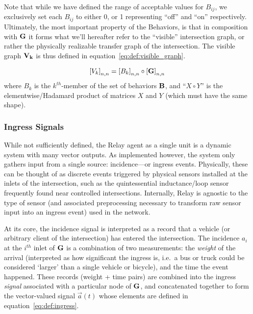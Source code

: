 \documentclass{report}
\begin{document}
Note that while we have defined the range of acceptable values for $B_{ij}$, we exclusively set each $B_{ij}$ to either 0, or 1 representing ``off'' and ``on'' respectively.
Ultimately, the most important property of the Behaviors, is that in composition with $\bf{G}$ it forms what we'll hereafter refer to the ``visible'' intersection graph, or rather the physically realizable transfer graph of the intersection.
The visible graph $\bf{V}_k$ is thus defined in equation~\eqref{eq:def:visible_graph}.

\begin{equation}\label{eq:def:visible_graph}
	\left[V_k\right]_{n,n} = \left[B_k\right]_{n,n} \circ \left[\bf{G}\right]_{n,n}
\end{equation}
where $B_k$ is the $k^{th}$-member of the set of behaviors $\bf{B}$, and ``$X \circ Y$'' is the elementwise/Hadamard product of matrices $X$ and $Y$ (which must have the same shape).


\subsubsection{Ingress Signals}
\label{sec:def:ingress}

While not sufficiently defined, the Relay agent as a single unit is a dynamic system with many vector outputs.
As implemented however, the system only gathers input from a single source: incidence---or ingress events.
Physically, these can be thought of as discrete events triggered by physical sensors installed at the inlets of the intersection, such as the quintessential inductance/loop sensor frequently found near controlled intersections.
Internally, Relay is agnostic to the type of sensor (and associated preprocessing necessary to transform raw sensor input into an ingress event) used in the network.

At its core, the incidence signal is interpreted as a record that a vehicle (or arbitrary client of the intersection) has entered the intersection.
The incidence $a_i$ at the $i^{th}$ inlet of $\bf{G}$ is a combination of two measurements: the \emph{weight} of the arrival (interpreted as how significant the ingress is, i.e.\ a bus or truck could be considered `larger' than a single vehicle or bicycle), and the time the event happened.
These records (weight + time pairs) are combined into the ingress \emph{signal} associated with a particular node of $\bf{G}$, and concatenated together to form the vector-valued signal $\vec{a}(t)$ whose elements are defined in equation~\eqref{eq:def:ingress}.
\end{document}
